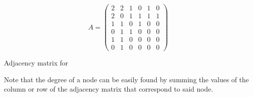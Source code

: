 \begin{table}[H]
  \begin{equation*}
    A = 
   \begin{pmatrix}
      2 & 2 & 1 & 0 & 1 & 0 \\
      2 & 0 & 1 & 1 & 1 & 1 \\
      1 & 1 & 0 & 1 & 0 & 0 \\
      0 & 1 & 1 & 0 & 0 & 0 \\
      1 & 1 & 0 & 0 & 0 & 0 \\
      0 & 1 & 0 & 0 & 0 & 0 
    \end{pmatrix}
  \end{equation*}
  \caption{Adjacency matrix for  }
\end{table}

\begin{remark}
  Note that the degree of a node can be easily found by summing the values of
  the column or row of the adjacency matrix that correspond to said node.
\end{remark}

